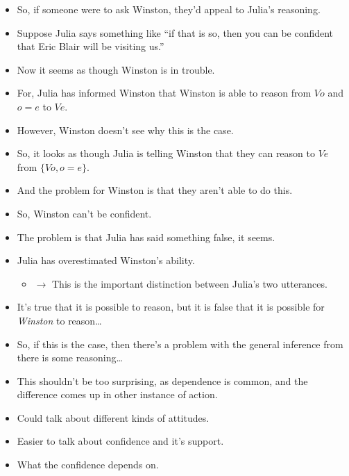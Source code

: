 \documentclass[10pt]{article}
\begin{document}
\begin{itemize}
\item So, if someone were to ask Winston, they'd appeal to Julia's reasoning.
\end{itemize}

\begin{itemize}
\item Suppose Julia says something like ``if that is so, then you can be confident that Eric Blair will be visiting us.''
\end{itemize}

\begin{itemize}
\item Now it seems as though Winston is in trouble.
\item For, Julia has informed Winston that Winston is able to reason from \(Vo\) and \(o = e\) to \(Ve\).
\item However, Winston doesn't see why this is the case.
\item So, it looks as though Julia is telling Winston that they can reason to \(Ve\) from \(\{Vo, o = e\}\).
\item And the problem for Winston is that they aren't able to do this.
\item So, Winston can't be confident.
\item The problem is that Julia has said something false, it seems.
\item Julia has overestimated Winston's ability.
  \begin{itemize}
  \item \(\rightarrow\) This is the important distinction between Julia's two utterances.
  \end{itemize}
\item It's true that it is possible to reason, but it is false that it is possible for \emph{Winston} to reason\dots
\item So, if this is the case, then there's a problem with the general inference from there is some reasoning\dots
\item This shouldn't be too surprising, as dependence is common, and the difference comes up in other instance of action.
\end{itemize}

\begin{itemize}
\item Could talk about different kinds of attitudes.
\item Easier to talk about confidence and it's support.
\item What the confidence depends on.
\end{itemize}
\end{document}
